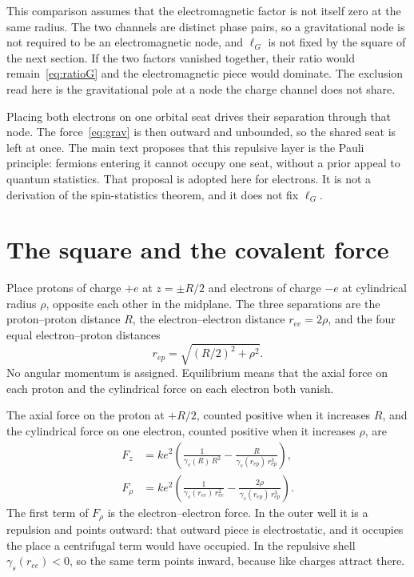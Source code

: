 \documentclass[a4paper]{article}
\begin{document}
This comparison assumes that the electromagnetic factor is not itself zero at the same radius. The two channels are distinct phase pairs, so a gravitational node is not required to be an electromagnetic node, and \(\ell_G\) is not fixed by the square of the next section. If the two factors vanished together, their ratio would remain~\eqref{eq:ratioG} and the electromagnetic piece would dominate. The exclusion read here is the gravitational pole at a node the charge channel does not share.

Placing both electrons on one orbital seat drives their separation through that node. The force~\eqref{eq:grav} is then outward and unbounded, so the shared seat is left at once. The main text proposes that this repulsive layer is the Pauli principle: fermions entering it cannot occupy one seat, without a prior appeal to quantum statistics. That proposal is adopted here for electrons. It is not a derivation of the spin-statistics theorem, and it does not fix \(\ell_G\).

\section{The square and the covalent force}
\label{sec:covalent}

Place protons of charge \(+e\) at \(z=\pm R/2\) and electrons of charge \(-e\) at cylindrical radius \(\rho\), opposite each other in the midplane. The three separations are the proton--proton distance \(R\), the electron--electron distance \(r_{ee}=2\rho\), and the four equal electron--proton distances
\[
r_{ep}=\sqrt{(R/2)^{2}+\rho^{2}}.
\]
No angular momentum is assigned. Equilibrium means that the axial force on each proton and the cylindrical force on each electron both vanish.

The axial force on the proton at \(+R/2\), counted positive when it increases \(R\), and the cylindrical force on one electron, counted positive when it increases \(\rho\), are
\begin{align}
F_z
  &=k e^{2}\left(
    \frac{1}{\gamma_s(R)\,R^{2}}
    -\frac{R}{\gamma_s(r_{ep})\,r_{ep}^{3}}
  \right),
\label{eq:Faxial}\\
F_{\rho}
  &=k e^{2}\left(
    \frac{1}{\gamma_s(r_{ee})\,r_{ee}^{2}}
    -\frac{2\rho}{\gamma_s(r_{ep})\,r_{ep}^{3}}
  \right).
\label{eq:Frho}
\end{align}
The first term of \(F_{\rho}\) is the electron--electron force. In the outer well it is a repulsion and points outward: that outward piece is electrostatic, and it occupies the place a centrifugal term would have occupied. In the repulsive shell \(\gamma_s(r_{ee})<0\), so the same term points inward, because like charges attract there.
\end{document}

